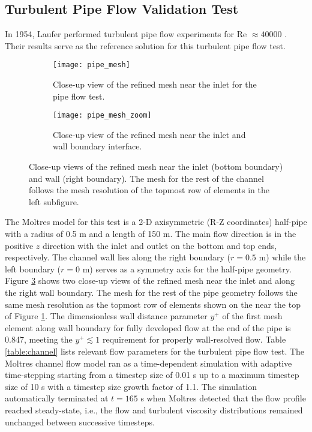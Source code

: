 \subsection{Turbulent Pipe Flow Validation Test}

In 1954, Laufer performed turbulent pipe flow experiments for Re $\approx 40000$
\cite{laufer_structure_1954}. Their results serve as the reference solution for this turbulent pipe
flow test.

\begin{figure}[htb!]
  \centering
  \begin{subfigure}[b]{0.42\columnwidth}
    \centering
    \texttt{[image: pipe\_mesh]}
    \caption{Close-up view of the refined mesh near the inlet for the pipe flow test.}
    \label{fig:pipe-mesh-1}
  \end{subfigure}
  \hfill
  \begin{subfigure}[b]{0.56\columnwidth}
    \centering
    \texttt{[image: pipe\_mesh\_zoom]}
    \caption{Close-up view of the refined mesh near the inlet and wall boundary interface.}
    \label{fig:pipe-mesh-2}
  \end{subfigure}
  \caption{Close-up views of the refined mesh near the inlet (bottom boundary) and wall (right
  boundary). The mesh for the rest of the channel follows the mesh resolution of the topmost row of
  elements in the left subfigure.}
  \label{fig:pipe-mesh}
\end{figure}

The Moltres model for this test is a 2-D axisymmetric (R-Z coordinates) half-pipe with a radius of
0.5 m and a length of 150 m. The main flow direction
is in the positive $z$ direction with the inlet and outlet on the bottom and top ends,
respectively. The channel wall lies along the right boundary ($r=0.5$ m) while the left boundary
($r=0$ m) serves as a symmetry axis for the half-pipe geometry. Figure \ref{fig:pipe-mesh} shows
two close-up views of the refined mesh near the inlet and along the right wall boundary. The mesh
for the rest of the pipe geometry follows the same mesh resolution as the topmost row of
elements shown on the near the top of Figure \ref{fig:pipe-mesh-1}. The dimensionless wall distance
parameter $y^+$ of the first mesh element along wall boundary for fully developed flow at the end
of the pipe is 0.847, meeting the
$y^+ \lesssim 1$ requirement for properly wall-resolved flow. Table \ref{table:channel} lists
relevant flow parameters for the turbulent pipe flow test. The Moltres channel flow model ran as a
time-dependent simulation with adaptive time-stepping starting from a timestep size of 0.01
s up to a maximum timestep size of 10 s with a timestep size growth factor of 1.1. The simulation
automatically terminated at $t=165$ s when Moltres detected that the flow profile reached
steady-state, i.e., the flow and turbulent viscosity distributions remained unchanged between
successive timesteps.

